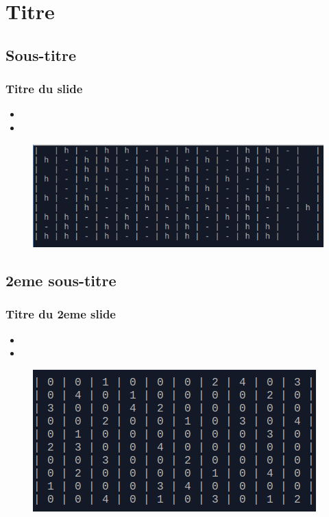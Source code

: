 \section{Titre}

	\subsection{Sous-titre}
		\begin{frame}
		    \frametitle{\textbf{Titre du slide}}
			\begin{itemize}
				 \item 
				 \item 
			\end{itemize}
			\begin{figure}[h]
				\centering
				\includegraphics[scale=0.50]{images/tirette/tirette_horizontale.png}
			\end{figure}
		\end{frame}

\subsection{2eme sous-titre}
	\begin{frame}
		\frametitle{\textbf{Titre du 2eme slide}}
		\begin{itemize}
			\item 
			\item 
		\end{itemize}
		\begin{figure}[h]
			\centering
			\includegraphics[scale=0.45]{images/boule/boule.png}
		\end{figure}
	\end{frame}